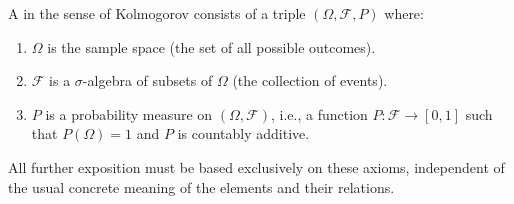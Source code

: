 A  in the sense of Kolmogorov consists of a triple $(\Omega, \mathcal{F}, P)$ where:
\begin{enumerate}
\item $\Omega$ is the sample space (the set of all possible outcomes).
\item $\mathcal{F}$ is a $\sigma$-algebra of subsets of $\Omega$ (the collection of events).
\item $P$ is a probability measure on $(\Omega, \mathcal{F})$, i.e., a function $P: \mathcal{F} \to [0,1]$ such that $P(\Omega) = 1$ and $P$ is countably additive.
\end{enumerate}
All further exposition must be based exclusively on these axioms, independent of the usual concrete meaning of the elements and their relations.
